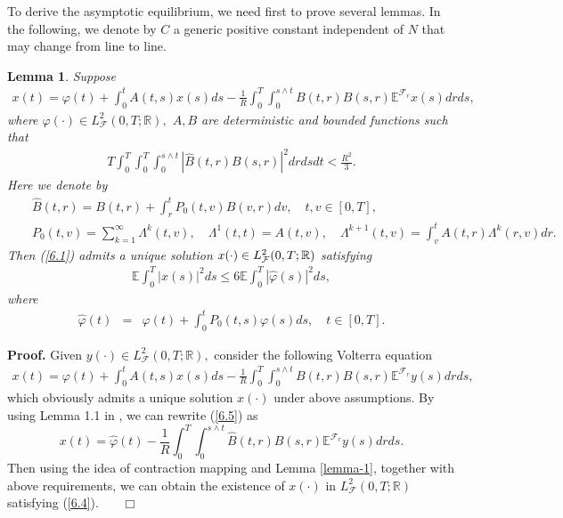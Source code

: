 \documentclass[11pt]{article}
\newenvironment{proof}[1][Proof]{\noindent \textbf{#1.} }{\ \ \  $\Box$}
\newtheorem{lemma}{Lemma}[section]
\def\dbE{\mathbb{E}}
\def\dbR{\mathbb{R}}
\begin{document}
%
To derive the asymptotic equilibrium, we need first to prove
several lemmas. In the following, we denote by $C$ a generic
positive constant independent of $N$ that may change from line to
line.
\begin{lemma}\label{lemma6-1}Suppose
\begin{eqnarray}\label{6.1}
x(t)=\varphi (t)+\int_{0}^{t}A(t,s)x(s)ds-\frac{1}{R}\int_{0}^{T}\int_{0}^{s%
\wedge t}B(t,r)B(s,r)\dbE^{\mathcal{F}_{r}}x(s)drds,
\end{eqnarray}
%
where $\varphi (\cdot )\in L_{\mathcal{F}}^{2}(0,T;\dbR),$ $A,B$ are
deterministic and bounded functions such that
%
\begin{eqnarray}\label{6.2}
T\int_{0}^{T}\int_{0}^{T}\int_{0}^{s\wedge t}|\widehat{B}%
(t,r)B(s,r)|^{2}drdsdt<\frac{R^{2}}{3}.
\end{eqnarray}
%
Here we denote by
\begin{eqnarray}\label{6.3}
&&\widehat{B}(t,r)=B(t,r)+\int_{r}^{t}P_0(t,v)B(v,r)dv,\quad
t,v\in[0,T],\nonumber\\
&&P_0(t,v) =\sum\limits_{k=1}^{\infty}\Lambda^{k}(t,v), \quad \Lambda^{1}(t,t) =A(t,v), \quad
\Lambda^{k+1}(t,v)=\int_{v}^{t}A(t,r)\Lambda^{k}(r,v)dr .
\end{eqnarray}
%
Then (\ref{6.1}) admits a unique solution $x(\cdot)\in L_{%
\mathcal{F}}^{2}(0,T;\dbR)$ satisfying
\begin{eqnarray}\label{6.4}
\dbE\int_{0}^{T}|x(s)|^{2}ds\leq 6\dbE\int_{0}^{T}|\widehat{\varphi}(s)|^{2}ds,
\end{eqnarray}
where
\begin{eqnarray*}
\widehat{\varphi }(t) &=&\varphi (t)+\int_{0}^{t}P_0(t,s)\varphi
(s)ds,\quad t\in[0,T].
\end{eqnarray*}
\end{lemma}
\begin{proof}
Given $y(\cdot )\in L_{\mathcal{F}}^{2}(0,T;\dbR),$ consider the
following Volterra equation%
\begin{eqnarray}\label{6.5}
x(t)=\varphi (t)+\int_{0}^{t}A(t,s)x(s)ds-\frac{1}{R}\int_{0}^{T}\int_{0}^{s%
\wedge t}B(t,r)B(s,r)\dbE^{\mathcal{F}_{r}}y(s)drds,
\end{eqnarray}
%
which obviously admits a unique solution $x(\cdot)$ under above
assumptions. By using Lemma 1.1 in
\cite{Y 1996}, we can rewrite (\ref{6.5}) as%
%
\[
x(t)=\widehat{\varphi }(t)-\frac{1}{R}\int_{0}^{T}\int_{0}^{s\wedge t}
\widehat{B}(t,r)B(s,r)\dbE^{\mathcal{F}_{r}}y(s)drds.
\]
%
Then using the idea of contraction mapping and Lemma \ref{lemma-1},
together with above requirements, we can obtain the existence of
$x(\cdot)$ in $L_{\mathcal{F}}^{2}(0,T;\dbR)$ satisfying
(\ref{6.4}).
\hfill
\end{proof}
\end{document}
